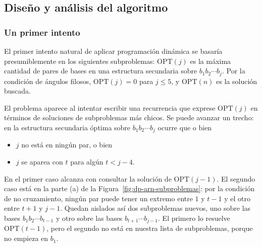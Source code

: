 \documentclass[12pt, spanish, oneside, openany]{book}
\theoremstyle{uprightplain}
\theoremstyle{definition}
\theoremstyle{remark}
\theoremstyle{definition}
\newcommand{\OPT}{\mathrm{OPT}} %
\begin{document}
\subsection{Diseño y análisis del algoritmo}

\subsubsection{Un primer intento}

El primer intento natural de aplicar programación dinámica se basaría presumiblemente en los siguientes subproblemas: $\OPT(j)$ es la máxima cantidad de pares de bases en una estructura secundaria sobre $b_1b_2\cdots b_j$. Por la condición de ángulos filosos, $\OPT(j)=0$ para $j\le 5$, y $\OPT(n)$ es la solución buscada.

El problema aparece al intentar escribir una recurrencia que exprese $\OPT(j)$ en términos de soluciones de subproblemas más chicos. Se puede avanzar un trecho: en la estructura secundaria óptima sobre $b_1b_2\cdots b_j$ ocurre que o bien
\begin{itemize}
    \item $j$ no está en ningún par, o bien
    \item $j$ se aparea con $t$ para algún $t<j-4$.
\end{itemize}
En el primer caso alcanza con consultar la solución de $\OPT(j-1)$. El segundo caso está en la parte (a) de la Figura~\ref{fig:dp-arn-subproblemas}: por la condición de no cruzamiento, ningún par puede tener un extremo entre $1$ y $t-1$ y el otro entre $t+1$ y $j-1$. Quedan aislados así dos subproblemas nuevos, uno sobre las bases $b_1b_2\cdots b_{t-1}$ y otro sobre las bases $b_{t+1}\cdots b_{j-1}$. El primero lo resuelve $\OPT(t-1)$, pero el segundo no está en nuestra lista de subproblemas, porque no empieza en $b_1$.
\end{document}

